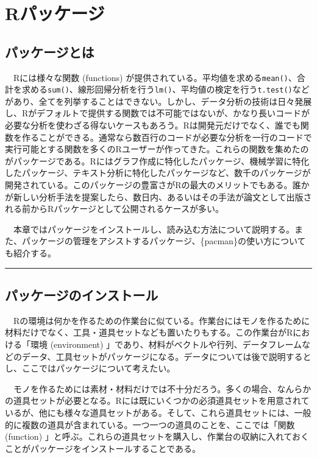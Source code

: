 \documentclass[
  a4paper,
  pandoc,
  ja=standard,
  jafont=haranoaji]{bxjsbook}
\begin{document}
\hypertarget{sec-packages}{%
\chapter{Rパッケージ}\label{sec-packages}}

\hypertarget{sec-packages_intro}{%
\section{パッケージとは}\label{sec-packages_intro}}

　Rには様々な関数 (functions)
が提供されている。平均値を求める\texttt{mean()}、合計を求める\texttt{sum()}、線形回帰分析を行う\texttt{lm()}、平均値の検定を行う\texttt{t.test()}などがあり、全てを列挙することはできない。しかし、データ分析の技術は日々発展し、Rがデフォルトで提供する関数では不可能ではないが、かなり長いコードが必要な分析を使わざる得ないケースもあろう。Rは開発元だけでなく、誰でも関数を作ることができる。通常なら数百行のコードが必要な分析を一行のコードで実行可能とする関数を多くのRユーザーが作ってきた。これらの関数を集めたのがパッケージである。Rにはグラフ作成に特化したパッケージ、機械学習に特化したパッケージ、テキスト分析に特化したパッケージなど、数千のパッケージが開発されている。このパッケージの豊富さがRの最大のメリットでもある。誰かが新しい分析手法を提案したら、数日内、あるいはその手法が論文として出版される前からRパッケージとして公開されるケースが多い。

　本章ではパッケージをインストールし、読み込む方法について説明する。また、パッケージの管理をアシストするパッケージ、\{pacman\}の使い方についても紹介する。

\begin{center}\rule{0.5\linewidth}{0.5pt}\end{center}

\hypertarget{sec-packages_install}{%
\section{パッケージのインストール}\label{sec-packages_install}}

　Rの環境は何かを作るための作業台に似ている。作業台にはモノを作るために材料だけでなく、工具・道具セットなども置いたりもする。この作業台がRにおける「環境
(environment)
」であり、材料がベクトルや行列、データフレームなどのデータ、工具セットがパッケージになる。データについては後で説明するとし、ここではパッケージについて考えたい。

　モノを作るためには素材・材料だけでは不十分だろう。多くの場合、なんらかの道具セットが必要となる。Rには既にいくつかの必須道具セットを用意されているが、他にも様々な道具セットがある。そして、これら道具セットには、一般的に複数の道具が含まれている。一つ一つの道具のことを、ここでは「関数
(function)
」と呼ぶ。これらの道具セットを購入し、作業台の収納に入れておくことがパッケージをインストールすることである。
\end{document}
